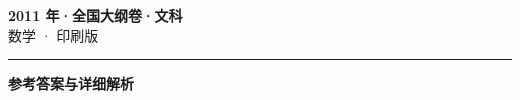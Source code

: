 \documentclass[zihao=5, a4paper]{ctexart}
\begin{document}
\begin{center}
  {\Large\bfseries 2011 年·全国大纲卷·文科}\\[4pt]
  {\large 数学 · 印刷版}
\end{center}
\medskip
{}

\par\bigskip\hrule\bigskip
{}
\begin{center}{\large\bfseries 参考答案与详细解析}\end{center}
\smallskip

\end{document}
